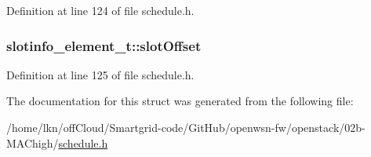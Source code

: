 Definition at line 124 of file schedule.\+h.

\subsubsection[{\texorpdfstring{slot\+Offset}{slotOffset}}]{ slotinfo\+\_\+element\+\_\+t\+::slot\+Offset}\hypertarget{structslotinfo__element__t_a83230334022a3600203819929c525d4b}{}\label{structslotinfo__element__t_a83230334022a3600203819929c525d4b}


Definition at line 125 of file schedule.\+h.



The documentation for this struct was generated from the following file\+:\begin{DoxyCompactItemize}
\item 
/home/lkn/off\+Cloud/\+Smartgrid-\/code/\+Git\+Hub/openwsn-\/fw/openstack/02b-\/\+M\+A\+Chigh/\hyperlink{schedule_8h}{schedule.\+h}\end{DoxyCompactItemize}
